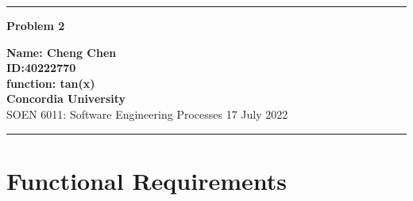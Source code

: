 \documentclass[10pt,a4paper,twoside]{article}
\begin{document}
\begin{center}
\hrule

\vspace{.4cm}
{\bf {\Huge Problem 2}}
\vspace{.2cm}
\end{center}
{\bf Name: Cheng Chen}  \\
{\bf ID:40222770}\\
{\bf function: tan(x)}\\
{\bf Concordia University}\\
SOEN 6011: Software Engineering Processes {\bf  } \hspace{\fill}  17 July  2022 \\
\hrule







\section{Functional Requirements}
\end{document}
